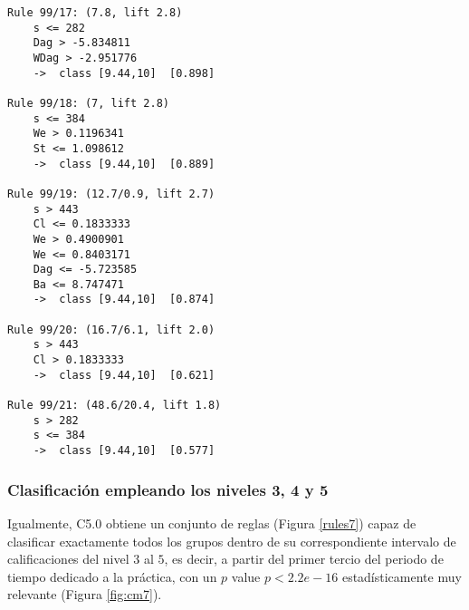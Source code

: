 \begin{tcolorbox}[title=Reglas de clasificación para identificar intervalos de notas.]
\begin{multicols}{3}
\begin{verbatim}
Rule 99/17: (7.8, lift 2.8)
	s <= 282
	Dag > -5.834811
	WDag > -2.951776
	->  class [9.44,10]  [0.898]

Rule 99/18: (7, lift 2.8)
	s <= 384
	We > 0.1196341
	St <= 1.098612
	->  class [9.44,10]  [0.889]

Rule 99/19: (12.7/0.9, lift 2.7)
	s > 443
	Cl <= 0.1833333
	We > 0.4900901
	We <= 0.8403171
	Dag <= -5.723585
	Ba <= 8.747471
	->  class [9.44,10]  [0.874]

Rule 99/20: (16.7/6.1, lift 2.0)
	s > 443
	Cl > 0.1833333
	->  class [9.44,10]  [0.621]

Rule 99/21: (48.6/20.4, lift 1.8)
	s > 282
	s <= 384
	->  class [9.44,10]  [0.577]
    \end{verbatim}
  \end{multicols}
\label{rules8}
\end{tcolorbox}

\subsubsection{Clasificación empleando los niveles 3, 4 y 5}

Igualmente, C5.0 obtiene un conjunto de reglas (Figura \ref{rules7}) capaz de clasificar exactamente todos los grupos dentro de su correspondiente intervalo de calificaciones del nivel $3$ al $5$, es decir, a partir del primer tercio del periodo de tiempo dedicado a la práctica, con un $p$ value $p < 2.2e-16$ estadísticamente muy relevante (Figura \ref{fig:cm7}).

